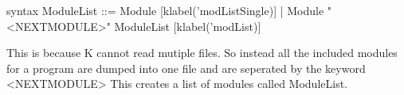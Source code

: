     syntax ModuleList ::= Module [klabel('modListSingle)] | Module "<NEXTMODULE>" ModuleList [klabel('modList)]

This is because K cannot read mutiple files. So instead all the included modules for a program are dumped into one file and are seperated by the keyword <NEXTMODULE>
This creates a list of modules called ModuleList.